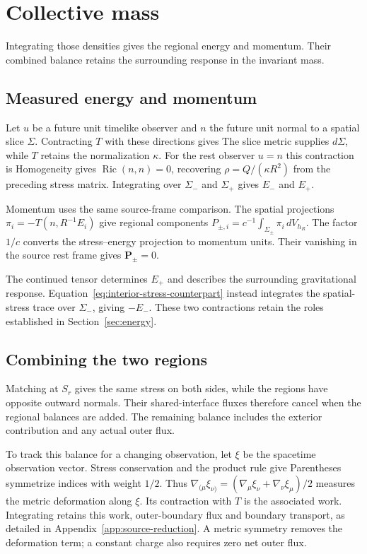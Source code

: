 \section{Collective mass}
\label{sec:collective-mass}
Integrating those densities gives the regional energy and momentum. Their combined balance retains the surrounding response in the invariant mass.

\subsection{Measured energy and momentum}
Let $u$ be a future unit timelike observer and $n$ the future unit normal to a spatial slice $\Sigma$. Contracting $T$ with these directions gives
\NativeObservedEnergyDisplay
The slice metric supplies $d\Sigma$, while $T$ retains the normalization $\kappa$. For the rest observer $u=n$ this contraction is
\NativeObservedDensityDisplay
Homogeneity gives $\operatorname{Ric}(n,n)=0$, recovering $\rho=Q/(\kappa R^2)$ from the preceding stress matrix. Integrating over $\Sigma_-$ and $\Sigma_+$ gives $E_-$ and $E_+$.

Momentum uses the same source-frame comparison. The spatial projections $\pi_i=-T(n,R^{-1}E_i)$ give regional components $P_{\pm,i}=c^{-1}\int_{\Sigma_\pm}\pi_i\,dV_{h_R}$. The factor $1/c$ converts the stress--energy projection to momentum units. Their vanishing in the source rest frame gives $\mathbf P_\pm=0$.

The continued tensor determines $E_+$ and describes the surrounding gravitational response. Equation~\eqref{eq:interior-stress-counterpart} instead integrates the spatial-stress trace over $\Sigma_-$, giving $-E_-$. These two contractions retain the roles established in Section~\ref{sec:energy}.

\subsection{Combining the two regions}
Matching at $S_r$ gives the same stress on both sides, while the regions have opposite outward normals. Their shared-interface fluxes therefore cancel when the regional balances are added. The remaining balance includes the exterior contribution and any actual outer flux.

To track this balance for a changing observation, let $\xi$ be the spacetime observation vector. Stress conservation and the product rule give
\NativeChargeBalanceDisplay
Parentheses symmetrize indices with weight $1/2$. Thus $\nabla_{(\mu}\xi_{\nu)}=(\nabla_\mu\xi_\nu+\nabla_\nu\xi_\mu)/2$ measures the metric deformation along $\xi$. Its contraction with $T$ is the associated work. Integrating retains this work, outer-boundary flux and boundary transport, as detailed in Appendix~\ref{app:source-reduction}. A metric symmetry removes the deformation term; a constant charge also requires zero net outer flux.

